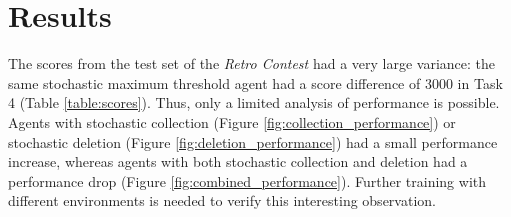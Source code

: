 \documentclass{article} %
\begin{document}
\section{Results}
The scores from the test set of the \textit{Retro Contest} had a very large variance: the same stochastic maximum threshold agent had a score difference of 3000 in Task 4 (Table \ref{table:scores}). Thus, only a limited analysis of performance is possible. Agents with stochastic collection (Figure \ref{fig:collection_performance}) or stochastic deletion (Figure \ref{fig:deletion_performance}) had a small performance increase, whereas agents with both stochastic collection and deletion had a performance drop (Figure \ref{fig:combined_performance}). Further training with different environments is needed to verify this interesting observation.
\end{document}
